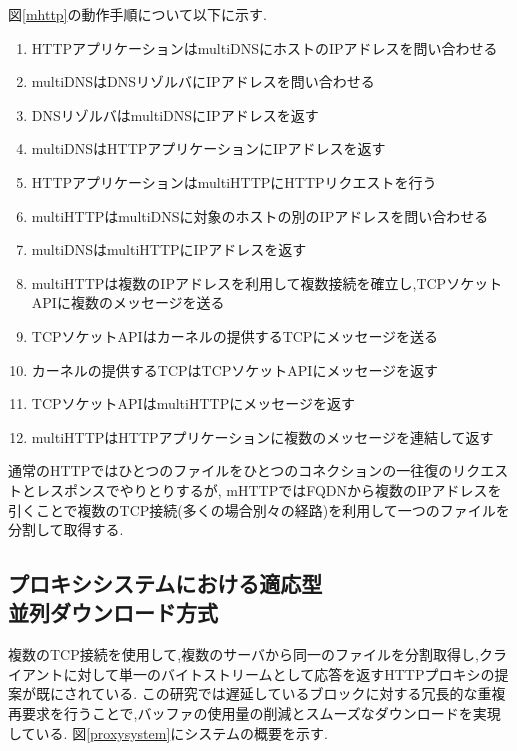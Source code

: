 \documentclass[a4j,12pt]{gradthesis_utf8}
\begin{document}
図\ref{mhttp}の動作手順について以下に示す.
\begin{enumerate}
\item HTTPアプリケーションはmultiDNSにホストのIPアドレスを問い合わせる
\item multiDNSはDNSリゾルバにIPアドレスを問い合わせる
\item DNSリゾルバはmultiDNSにIPアドレスを返す
\item multiDNSはHTTPアプリケーションにIPアドレスを返す
\item HTTPアプリケーションはmultiHTTPにHTTPリクエストを行う
\item multiHTTPはmultiDNSに対象のホストの別のIPアドレスを問い合わせる
\item multiDNSはmultiHTTPにIPアドレスを返す
\item multiHTTPは複数のIPアドレスを利用して複数接続を確立し,TCPソケットAPIに複数のメッセージを送る
\item TCPソケットAPIはカーネルの提供するTCPにメッセージを送る
\item カーネルの提供するTCPはTCPソケットAPIにメッセージを返す
\item TCPソケットAPIはmultiHTTPにメッセージを返す
\item multiHTTPはHTTPアプリケーションに複数のメッセージを連結して返す
\end{enumerate}

通常のHTTPではひとつのファイルをひとつのコネクションの一往復のリクエストとレスポンスでやりとりするが,
mHTTPではFQDNから複数のIPアドレスを引くことで複数のTCP接続(多くの場合別々の経路)を利用して一つのファイルを分割して取得する.

\newpage

\subsection{プロキシシステムにおける適応型\\並列ダウンロード方式}
複数のTCP接続を使用して,複数のサーバから同一のファイルを分割取得し,クライアントに対して単一のバイトストリームとして応答を返すHTTPプロキシの提案が既にされている\cite{proxy}.
この研究では遅延しているブロックに対する冗長的な重複再要求を行うことで,バッファの使用量の削減とスムーズなダウンロードを実現している.
図\ref{proxysystem}にシステムの概要を示す.
\end{document}
